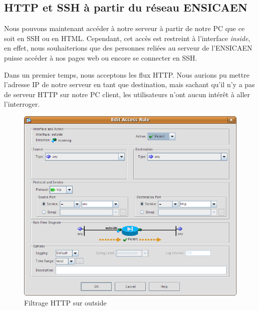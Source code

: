 \documentclass[a4paper,12pt]{article}
\begin{document}
\subsection{HTTP et SSH à partir du réseau ENSICAEN}
Nous pouvons maintenant accéder à notre serveur à partir de notre PC que ce soit en SSH ou en HTML. Cependant, cet accès est restreint à l'interface
\textit{inside}, en effet, nous souhaiterions que des personnes reliées au serveur de l'ENSICAEN puisse accéder à nos pages web ou encore se connecter en SSH.

Dans un premier temps, nous acceptons les flux HTTP. Nous aurions pu mettre l'adresse IP de notre serveur en tant que destination, mais sachant qu'il n'y a pas
de serveur HTTP sur notre PC client, les utilisateurs n'ont aucun intérêt à aller l'interroger.
\begin{figure}[H]
	\center
	\includegraphics[width=12cm]{img/17-policyoutsidehttpany.png}
	\caption{Filtrage HTTP sur outside}
\end{figure}
\end{document}
